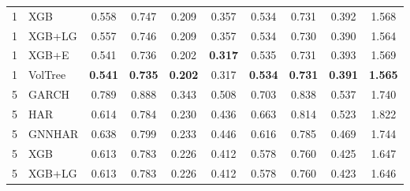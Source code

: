 \documentclass[runningheads]{llncs}
\begin{document}
\begin{table}[t]
\begin{tabular}{ll cccc cccc}
1 & XGB      & 0.558 & 0.747 & 0.209 & 0.357 & 0.534 & 0.731 & 0.392 & 1.568 \\ %
1 & XGB+LG   & 0.557 & 0.746 & 0.209 & 0.357 & 0.534 & 0.730 & 0.390 & 1.564 \\ %
1 & XGB+E    & 0.541 & 0.736 & 0.202 & \textbf{0.317} & 0.535 & 0.731 & 0.393 & 1.569 \\ %
1 & VolTree & \textbf{0.541} & \textbf{0.735} & \textbf{0.202} & 0.317 & \textbf{0.534} & \textbf{0.731} & \textbf{0.391} & \textbf{1.565} \\ %
\midrule
5 & GARCH    & 0.789 & 0.888 & 0.343 & 0.508 & 0.703 & 0.838 & 0.537 & 1.740 \\ %
5 & HAR      & 0.614 & 0.784 & 0.230 & 0.436 & 0.663 & 0.814 & 0.523 & 1.822 \\ %
5 & GNNHAR   & 0.638 & 0.799 & 0.233 & 0.446 & 0.616 & 0.785 & 0.469 & 1.744 \\ %
5 & XGB      & 0.613 & 0.783 & 0.226 & 0.412 & 0.578 & 0.760 & 0.425 & 1.647 \\ %
5 & XGB+LG   & 0.613 & 0.783 & 0.226 & 0.412 & 0.578 & 0.760 & 0.423 & 1.646 \\ %

\end{tabular}
\end{table}
\end{document}
